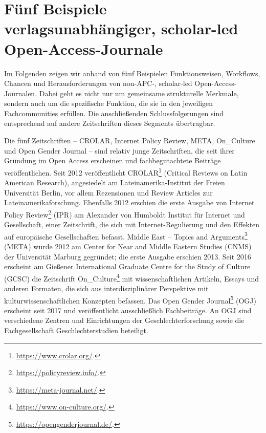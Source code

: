 \documentclass[a4paper,
fontsize=11pt,
oneside,
numbers=noperiodatend,
parskip=half-,
bibliography=totoc,
final
]{scrartcl}
\begin{document}
\hypertarget{fuxfcnf-beispiele-verlagsunabhuxe4ngiger-scholar-led-open-access-journale}{%
\section{Fünf Beispiele verlagsunabhängiger, scholar-led
Open-Access-Journale}\label{fuxfcnf-beispiele-verlagsunabhuxe4ngiger-scholar-led-open-access-journale}}

Im Folgenden zeigen wir anhand von fünf Beispielen Funktionsweisen,
Workflows, Chancen und Herausforderungen von non-APC-, scholar-led
Open-Access-Journalen. Dabei geht es nicht nur um gemeinsame
strukturelle Merkmale, sondern auch um die spezifische Funktion, die sie
in den jeweiligen Fachcommunities erfüllen. Die anschließenden
Schlussfolgerungen sind entsprechend auf andere Zeitschriften dieses
Segments übertragbar.

Die fünf Zeitschriften -- CROLAR, Internet Policy Review, META,
On\_Culture und Open Gender Journal -- sind relativ junge Zeitschriften,
die seit ihrer Gründung im Open Access erscheinen und fachbegutachtete
Beiträge veröffentlichen. Seit 2012 veröffentlicht CROLAR\footnote{\url{https://www.crolar.org/}.}
(Critical Reviews on Latin American Research), angesiedelt am
Lateinamerika-Institut der Freien Universität Berlin, vor allem
Rezensionen und Review Articles zur Lateinamerikaforschung. Ebenfalls
2012 erschien die erste Ausgabe von Internet Policy Review\footnote{\url{https://policyreview.info/}.}
(IPR) am Alexander von Humboldt Institut für Internet und Gesellschaft,
einer Zeitschrift, die sich mit Internet-Regulierung und den Effekten
auf europäische Gesellschaften befasst. Middle East -- Topics and
Arguments\footnote{\url{https://meta-journal.net/}.} (META) wurde 2012
am Center for Near and Middle Eastern Studies (CNMS) der Universität
Marburg gegründet; die erste Ausgabe erschien 2013. Seit 2016 erscheint
am Gießener International Graduate Centre for the Study of Culture
(GCSC) die Zeitschrift On\_Culture\footnote{\url{https://www.on-culture.org/}.}
mit wissenschaftlichen Artikeln, Essays und anderen Formaten, die sich
aus interdisziplinärer Perspektive mit kulturwissenschaftlichen
Konzepten befassen. Das Open Gender Journal\footnote{\url{https://opengenderjournal.de/}.}
(OGJ) erscheint seit 2017 und veröffentlicht ausschließlich
Fachbeiträge. An OGJ sind verschiedene Zentren und Einrichtungen der
Geschlechterforschung sowie die Fachgesellschaft Geschlechterstudien
beteiligt.
\end{document}
